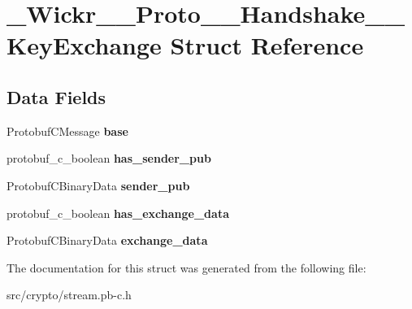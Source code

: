 \hypertarget{struct___wickr_____proto_____handshake_____key_exchange}{}\section{\+\_\+\+Wickr\+\_\+\+\_\+\+Proto\+\_\+\+\_\+\+Handshake\+\_\+\+\_\+\+Key\+Exchange Struct Reference}
\label{struct___wickr_____proto_____handshake_____key_exchange}
\subsection*{Data Fields}
\begin{DoxyCompactItemize}
\item 
\mbox{\label{struct___wickr_____proto_____handshake_____key_exchange_aba2684db9ac9791aac197bd8263f7678}} 
Protobuf\+C\+Message {\bfseries base}
\item 
\mbox{\label{struct___wickr_____proto_____handshake_____key_exchange_ac9b4b0e62f8a53ad7fdff84ab5f442dd}} 
protobuf\+\_\+c\+\_\+boolean {\bfseries has\+\_\+sender\+\_\+pub}
\item 
\mbox{\label{struct___wickr_____proto_____handshake_____key_exchange_ab85a9447340668bede61222c6e6c0731}} 
Protobuf\+C\+Binary\+Data {\bfseries sender\+\_\+pub}
\item 
\mbox{\label{struct___wickr_____proto_____handshake_____key_exchange_a0f5bc63f0be52de3def2e065b663ec4f}} 
protobuf\+\_\+c\+\_\+boolean {\bfseries has\+\_\+exchange\+\_\+data}
\item 
\mbox{\label{struct___wickr_____proto_____handshake_____key_exchange_a494d47162f1b13c7cb5f6f9eaf7b9b05}} 
Protobuf\+C\+Binary\+Data {\bfseries exchange\+\_\+data}
\end{DoxyCompactItemize}


The documentation for this struct was generated from the following file\+:\begin{DoxyCompactItemize}
\item 
src/crypto/stream.\+pb-\/c.\+h\end{DoxyCompactItemize}
